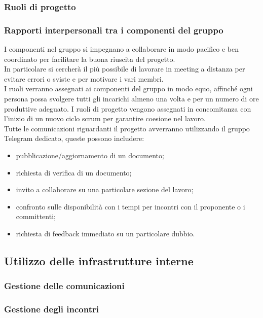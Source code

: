 \subsubsection{Ruoli di progetto}
\subsubsection{Rapporti interpersonali tra i componenti del gruppo}
I componenti nel gruppo si impegnano a collaborare in modo pacifico e ben coordinato per facilitare la buona riuscita del progetto. \\
In particolare si cercherà il più possibile di lavorare in meeting a distanza per evitare errori o sviste e per motivare i vari membri. \\
I ruoli verranno assegnati ai componenti del gruppo in modo equo, affinché ogni persona possa svolgere tutti gli incarichi almeno una volta e per un numero di ore produttive adeguato. I ruoli di progetto vengono assegnati in concomitanza con l’inizio di un nuovo ciclo scrum per garantire coesione nel lavoro. \\
Tutte le comunicazioni riguardanti il progetto avverranno utilizzando il gruppo Telegram dedicato, queste possono includere:

\begin{itemize}
    \item pubblicazione/aggiornamento di un documento;
    \item richiesta di verifica di un documento;
    \item invito a collaborare su una particolare sezione del lavoro;
    \item confronto sulle disponibilità con i tempi per incontri con il proponente o i committenti;
    \item richiesta di feedback immediato su un particolare dubbio.
\end{itemize}


\subsection{Utilizzo delle infrastrutture interne}
\subsubsection{Gestione delle comunicazioni}
\subsubsection{Gestione degli incontri}
